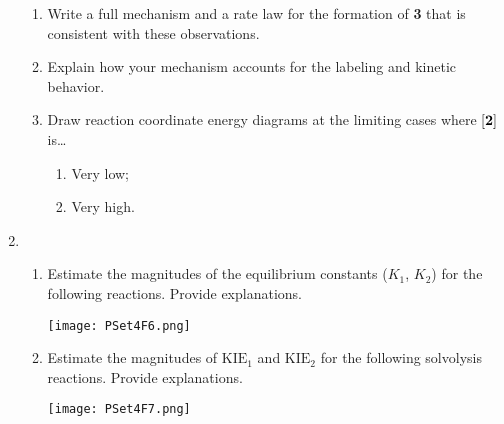 \documentclass[../psets.tex]{subfiles}
\begin{document}
\begin{enumerate}
\begin{enumerate}
        \item Write a full mechanism and a rate law for the formation of \textbf{3} that is consistent with these observations.
        \item Explain how your mechanism accounts for the labeling and kinetic behavior.
        \item Draw reaction coordinate energy diagrams at the limiting cases where $\cnc{\textbf{2}}$ is\dots
        \begin{enumerate}[label={\roman*)}]
            \item Very low;
            \item Very high.
        \end{enumerate}
    \end{enumerate}
    \pagebreak
    \item 
    \begin{enumerate}
        \item Estimate the magnitudes of the equilibrium constants ($K_1$, $K_2$) for the following reactions. Provide explanations.
        \begin{center}
            \texttt{[image: PSet4F6.png]}
        \end{center}
        \item Estimate the magnitudes of $\text{KIE}_1$ and $\text{KIE}_2$ for the following solvolysis reactions. Provide explanations.
        \begin{center}
            \texttt{[image: PSet4F7.png]}
        \end{center}
    \end{enumerate}
\end{enumerate}
\end{document}

